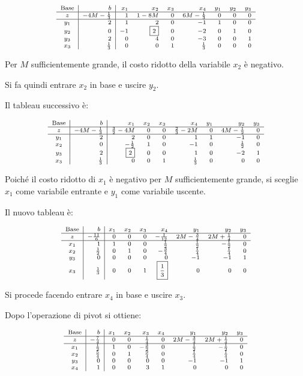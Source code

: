 \[
\scriptsize
\begin{array}{c|r|rrrrrrr}
\text{Base}&b&
x_1&x_2&x_3&x_4&y_1&y_2&y_3\\
\hline
z&-4M-\frac13&
1&1-8M&0&6M-\frac13&0&0&0\\
\hline
y_1&2&1&2&0&-1&1&0&0\\
y_2&0&-1&\boxed{2}&0&-2&0&1&0\\
y_3&2&0&4&0&-3&0&0&1\\
x_3&\frac13&0&0&1&\frac13&0&0&0
\end{array}
\]

Per $M$ sufficientemente grande,
il costo ridotto della variabile $x_2$
è negativo.

Si fa quindi entrare $x_2$ in base
e uscire $y_2$.

Il tableau successivo è:

\[
\scriptsize
\begin{array}{c|r|rrrrrrr}
\text{Base}&b&
x_1&x_2&x_3&x_4&y_1&y_2&y_3\\
\hline
z&-4M-\frac13&
\frac32-4M&0&0&\frac23-2M&
0&4M-\frac12&0\\
\hline
y_1&2&2&0&0&1&1&-1&0\\
x_2&0&-\frac12&1&0&-1&0&\frac12&0\\
y_3&2&\boxed{2}&0&0&1&0&-2&1\\
x_3&\frac13&0&0&1&\frac13&0&0&0
\end{array}
\]

Poiché il costo ridotto di $x_1$ è negativo
per $M$ sufficientemente grande,
si sceglie $x_1$ come variabile entrante
e $y_1$ come variabile uscente.

Il nuovo tableau è:

\[
\scriptsize
\begin{array}{c|r|rrrrrrr}
\text{Base}&b&
x_1&x_2&x_3&x_4&y_1&y_2&y_3\\
\hline
z&-\frac{11}{6}&
0&0&0&-\frac1{12}&
2M-\frac34&2M+\frac14&0\\
\hline
x_1&1&1&0&0&\frac12&\frac12&-\frac12&0\\
x_2&\frac12&0&1&0&-\frac34&\frac14&\frac14&0\\
y_3&0&0&0&0&0&-1&-1&1\\
x_3&\frac13&0&0&1&\boxed{\frac13}&0&0&0
\end{array}
\]

Si procede facendo entrare $x_4$ in base
e uscire $x_3$.

Dopo l'operazione di pivot si ottiene:

\[
\scriptsize
\begin{array}{c|r|rrrrrrr}
\text{Base}&b&
x_1&x_2&x_3&x_4&y_1&y_2&y_3\\
\hline
z&-\frac74&
0&0&\frac14&0&
2M-\frac34&2M+\frac14&0\\
\hline
x_1&\frac12&1&0&-\frac32&0&\frac12&-\frac12&0\\
x_2&\frac54&0&1&\frac94&0&\frac14&\frac14&0\\
y_3&0&0&0&0&0&-1&-1&1\\
x_4&1&0&0&3&1&0&0&0
\end{array}
\]

